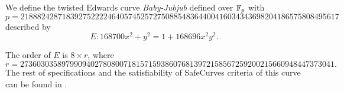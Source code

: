 We define the twisted Edwards curve {\it Baby-Jubjub} defined over $\mathbb{F}_p$ with 
	$$	p = 21888242871839275222246405745257275088548364
			400416034343698204186575808495617 $$
described by 
	$$	E: 168700 x^2 + y^2 = 1 + 168696 x^2 y^2. $$  

The order of $E$ is $8\times r$, where 
	$$	r = 2736030358979909402780800718157159386076813
			972158567259200215660948447373041. $$ 
The rest of specifications and the satisfiability of SafeCurves criteria  of this curve can be found in \cite{github-barry}. 